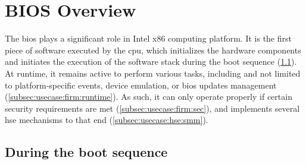 %

\section{BIOS Overview}
\label{sec:usecase:firmware}

The \ac{bios} plays a significant role in Intel x86 computing platform.
%
It is the first piece of software executed by the \ac{cpu}, which initializes
the hardware components and initiates the execution of the software stack during
the boot sequence (\ref{subsec:usecase:firm:boot}).
%
At runtime, it remains active to perform various tasks, including and not
limited to platform-specific events, device emulation, or \ac{bios} updates
management (\ref{subsec:usecase:firm:runtime}).
%
As such, it can only operate properly if certain security requirements are met
(\ref{subsec:usecase:firm:sec}), and implements several \ac{hse} mechanisms to
that end (\ref{subsec:usecase:hse:smm}).

\subsection{During the boot sequence}
\label{subsec:usecase:firm:boot}

